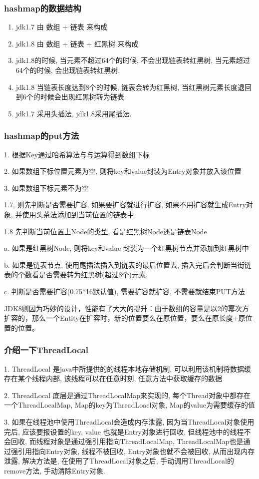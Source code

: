 \documentclass[UTF8]{ctexart}
\begin{document}
\subsubsection{hashmap的数据结构}
\begin{enumerate}
	\item jdk1.7 由 数组 + 链表  来构成
	\item jdk1.8 由 数组 + 链表 + 红黑树 来构成
	\item jdk1.8的时候, 当元素不超过64个的时候, 不会出现链表转红黑树, 当元素超过64个的时候, 会出现链表转红黑树.
	\item jdk1.8 当链表长度达到8个的时候, 链表会转为红黑树, 当红黑树元素长度退回到6个的时候会出现红黑树转为链表.
	\item jdk1.7 采用头插法, jdk1.8采用尾插法.
\end{enumerate}
\subsubsection{hashmap的put方法}
1. 根据Key通过哈希算法与与运算得到数组下标 \par
2. 如果数组下标位置元素为空, 则将key和value封装为Entry对象并放入该位置 \par
3. 如果数组下标元素不为空 \par
1.7, 则先判断是否需要扩容, 如果要扩容就进行扩容, 如果不用扩容就生成Entry对象, 并使用头茶法添加到当前位置的链表中 \par
1.8 先判断当前位置上Node的类型, 看是红黑树Node还是链表Node \par
a. 如果是红黑树Node, 则将key和value 封装为一个红黑树节点并添加到红黑树中 \par
b. 如果是链表节点, 使用尾插法插入到链表的最后位置去, 插入完后会判断当街链表的个数看是否需要转为红黑树(超过8个)元素. \par
c. 判断是否需要扩容(0.75*16默认值), 需要扩容就扩容, 不需要就结束PUT方法 \par

JDK8则因为巧妙的设计，性能有了大大的提升：由于数组的容量是以2的幂次方扩容的，那么一个Entity在扩容时，新的位置要么在原位置，要么在原长度+原位置的位置。
\subsubsection{介绍一下ThreadLocal}
1. ThreadLocal 是java中所提供的的线程本地存储机制, 可以利用该机制将数据缓存在某个线程内部, 该线程可以在任意时刻, 任意方法中获取缓存的数据 \par
2. ThreadLocal 底层是通过ThreadLocalMap来实现的, 每个Thread对象中都存在一个ThreadLocalMap, Map的key为ThreadLoacl对象, Map的value为需要缓存的值 \par
3. 如果在线程池中使用ThreadLocal会造成内存泄露, 因为当ThreadLocal对象使用完后, 应该要报设置的key, value 也就是Entry对象进行回收, 但线程池中的线程不会回收, 而线程对象是通过强引用指向ThreadLocalMap, ThreadLocalMap也是通过强引用指向Entry对象, 线程不被回收, Entry对象也就不会被回收, 从而出现内存泄露, 解决方法是, 在使用了ThreadLocal对象之后, 手动调用ThreadLocal的remove方法, 手动清除Entry对象. \par
\end{document}
